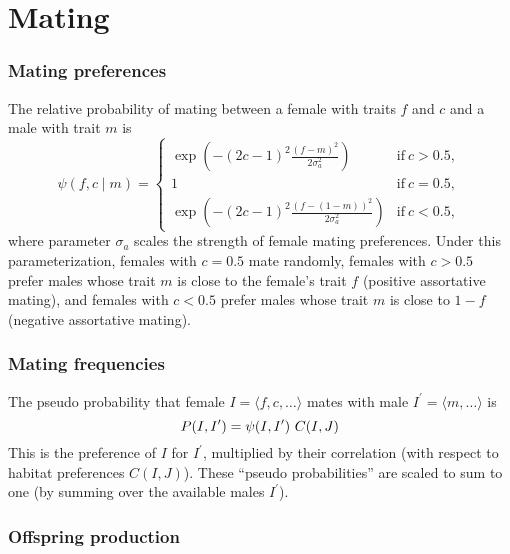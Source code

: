 \documentclass{article}
\begin{document}
\section{Mating}

\subsubsection{Mating preferences}

The relative probability of mating between a
female with traits $f$ and $c$ and a male with trait $m$ is
\begin{equation} \label{pref}
  \psi(f,c\mid m) = \left\{
    \begin{array}{ll}
      \exp \left( -(2c-1)^2 \frac{(f-m)^2}{2\sigma_a^2}\right)
        & \mbox{if}\ c > 0.5,\\
      1 & \mbox{if}\ c=0.5,\\
      \exp \left( -(2c-1)^2 \frac{(f-(1-m))^2}{2\sigma_a^2}\right)
        & \mbox{if}\ c<0.5,
    \end{array} \right.
\end{equation}
where parameter $\sigma_a$ scales the strength of female mating preferences.
Under this parameterization, females with $c=0.5$ mate randomly, females with $c>0.5$ prefer males whose trait $m$ is close to the female's trait $f$ (positive assortative mating), and females with $c<0.5$ prefer males whose trait $m$ is close to $1-f$ (negative assortative mating). 


\subsubsection{Mating frequencies}

The pseudo probability that female
$I = \langle f,c,\ldots \rangle$ mates with male $I^{\prime}= \langle m,\ldots \rangle$ is
\begin{equation}
  P(I,I^{\prime}) = \psi(I,I^{\prime})\ C(I,J) \\
\end{equation}
This is the preference of $I$ for $I^{\prime}$, multiplied by their correlation (with respect to habitat preferences $C(I,J)$).
These ``pseudo probabilities'' are scaled to sum to one (by summing over the available males $I^\prime$).


\subsubsection{Offspring production}
\end{document}
